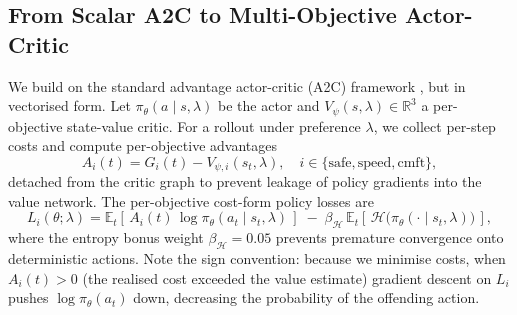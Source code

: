 \documentclass[12pt, letterpaper]{article}
\begin{document}
\subsection{From Scalar A2C to Multi-Objective Actor-Critic}
We build on the standard advantage actor-critic (A2C) framework \cite{mnih2016a3c,konda2000actor}, but in vectorised form. Let $\pi_\theta(a\mid s, \lambda)$ be the actor and $V_\psi(s, \lambda) \in \mathbb{R}^3$ a per-objective state-value critic. For a rollout under preference $\lambda$, we collect per-step costs and compute per-objective advantages
\begin{equation}
    A_i(t) = G_i(t) - V_{\psi,i}(s_t, \lambda), \quad i \in \{\text{safe}, \text{speed}, \text{cmft}\},
\end{equation}
detached from the critic graph to prevent leakage of policy gradients into the value network. The per-objective cost-form policy losses are
\begin{equation}
    L_i(\theta;\lambda) = \mathbb{E}_t\!\left[\,A_i(t)\,\log \pi_\theta(a_t \mid s_t, \lambda)\,\right]\; -\; \beta_{\mathcal{H}}\,\mathbb{E}_t\!\left[\,\mathcal{H}\!\big(\pi_\theta(\cdot \mid s_t, \lambda)\big)\,\right],
    \label{eq:per-obj-loss}
\end{equation}
where the entropy bonus weight $\beta_{\mathcal{H}}=0.05$ prevents premature convergence onto deterministic actions. Note the sign convention: because we minimise costs, when $A_i(t) > 0$ (the realised cost exceeded the value estimate) gradient descent on $L_i$ pushes $\log \pi_\theta(a_t)$ down, decreasing the probability of the offending action.
\end{document}
